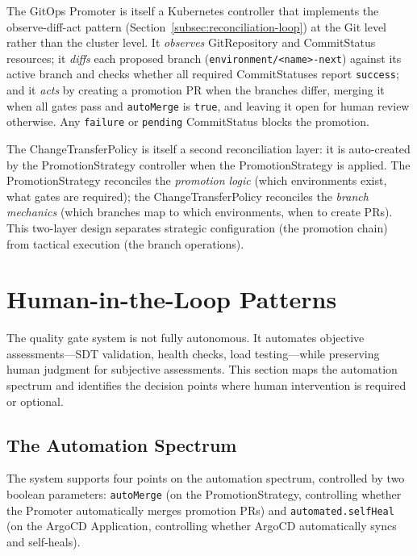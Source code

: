 The GitOps Promoter is itself a Kubernetes controller that implements the observe-diff-act pattern (Section~\ref{subsec:reconciliation-loop}) at the Git level rather than the cluster level. It \textit{observes} GitRepository and CommitStatus resources; it \textit{diffs} each proposed branch (\texttt{environment/<name>-next}) against its active branch and checks whether all required CommitStatuses report \texttt{success}; and it \textit{acts} by creating a promotion PR when the branches differ, merging it when all gates pass and \texttt{autoMerge} is \texttt{true}, and leaving it open for human review otherwise. Any \texttt{failure} or \texttt{pending} CommitStatus blocks the promotion.

The ChangeTransferPolicy is itself a second reconciliation layer: it is auto-created by the PromotionStrategy controller when the PromotionStrategy is applied. The PromotionStrategy reconciles the \textit{promotion logic} (which environments exist, what gates are required); the ChangeTransferPolicy reconciles the \textit{branch mechanics} (which branches map to which environments, when to create PRs). This two-layer design separates strategic configuration (the promotion chain) from tactical execution (the branch operations).

\section{Human-in-the-Loop Patterns}
\label{sec:human-in-the-loop}

The quality gate system is not fully autonomous. It automates objective assessments---SDT validation, health checks, load testing---while preserving human judgment for subjective assessments. This section maps the automation spectrum and identifies the decision points where human intervention is required or optional.

\subsection{The Automation Spectrum}
\label{subsec:automation-spectrum}

The system supports four points on the automation spectrum, controlled by two boolean parameters: \texttt{autoMerge} (on the PromotionStrategy, controlling whether the Promoter automatically merges promotion PRs) and \texttt{automated.selfHeal} (on the ArgoCD Application, controlling whether ArgoCD automatically syncs and self-heals).

